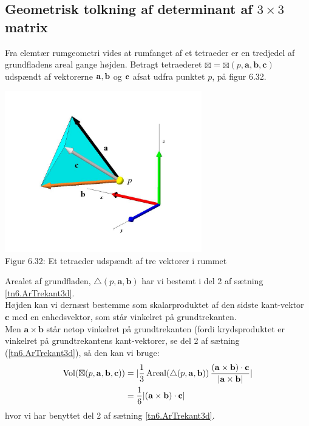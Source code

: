 \subsection{Geometrisk tolkning af determinant af $3\times 3$ matrix}
Fra elemtær rumgeometri vides at rumfanget af et tetraeder er en tredjedel af grundfladens areal gange højden. Betragt tetraederet 
$\boxtimes = \boxtimes(p,\mathbf{a}, \mathbf{b}, \mathbf{c})$ udspændt af vektorerne $\mathbf{a}, \mathbf{b}$ og $\mathbf{c}$ afsat udfra punktet $p$, på figur 6.32.
\begin{center}
\includegraphics[height=70mm]{geometer/Tripod01.jpg}	
	\\Figur 6.32: Et tetraeder udspændt af tre vektorer i rummet
\end{center}

Arealet af grundfladen, $\bigtriangleup(p, \mathbf{a}, \mathbf{b})$ har vi bestemt i del 2 af sætning \ref{tn6.ArTrekant3d}.\\

Højden kan vi dernæst bestemme som skalarproduktet af den sidste kant-vektor $\mathbf{c}$ med en enhedsvektor, som står vinkelret på grundtrekanten.\\

Men $\mathbf{a} \times \mathbf{b}$ står netop vinkelret på grundtrekanten (fordi krydsproduktet er vinkelret på grundtrekantens kant-vektorer, se del 2 af sætning (\ref{tn6.ArTrekant3d}), så den kan vi bruge:
\begin{equation} \label{tn6.eqRumfang01}
\begin{aligned}
\operatorname{Vol}(\boxtimes(p,\mathbf{a}, \mathbf{b}, \mathbf{c})) &= | \frac{1}{3}\operatorname{Areal}(\bigtriangleup(p, \mathbf{a}, \mathbf{b}))\,\frac{(\mathbf{a} \times \mathbf{b})\cdot \mathbf{c}}{| \mathbf{a} \times \mathbf{b} |} | \\
&= \frac{1}{6}|(\mathbf{a} \times \mathbf{b})\cdot \mathbf{c}|
\end{aligned}
\end{equation}
hvor vi har benyttet del 2 af sætning \ref{tn6.ArTrekant3d}.\\

